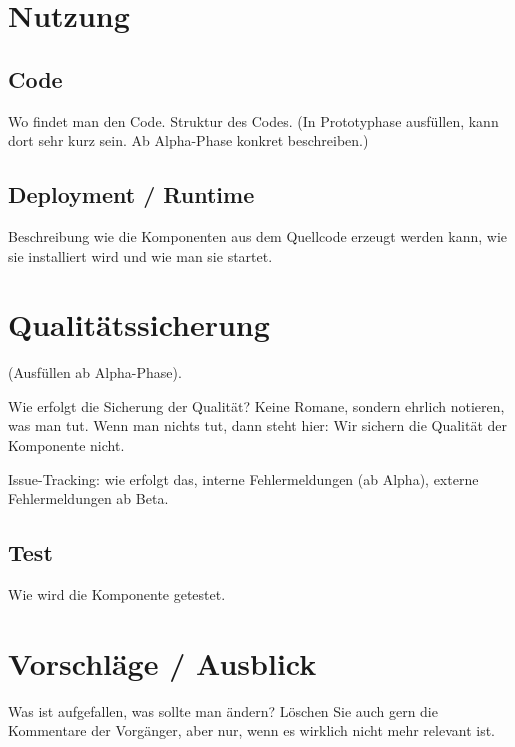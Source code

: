 \section{Nutzung}
\subsection{Code}
Wo findet man den Code. Struktur des Codes. (In Prototyphase ausfüllen,
kann dort sehr kurz sein. Ab Alpha-Phase konkret beschreiben.)

\subsection{Deployment / Runtime}
Beschreibung wie die Komponenten aus dem Quellcode erzeugt werden kann,
wie sie installiert wird und wie man sie startet.

\section{Qualitätssicherung}
(Ausfüllen ab Alpha-Phase).

Wie erfolgt die Sicherung der Qualität? Keine Romane, sondern ehrlich notieren,
was man tut. Wenn man nichts tut, dann steht hier: Wir sichern die Qualität der
Komponente nicht.

Issue-Tracking: wie erfolgt das, interne Fehlermeldungen (ab Alpha), 
externe Fehlermeldungen ab Beta.

\subsection{Test}
Wie wird die Komponente getestet.

\section{Vorschläge / Ausblick}
Was ist aufgefallen, was sollte man ändern? Löschen Sie auch gern die Kommentare
der Vorgänger, aber nur, wenn es wirklich nicht mehr relevant ist.